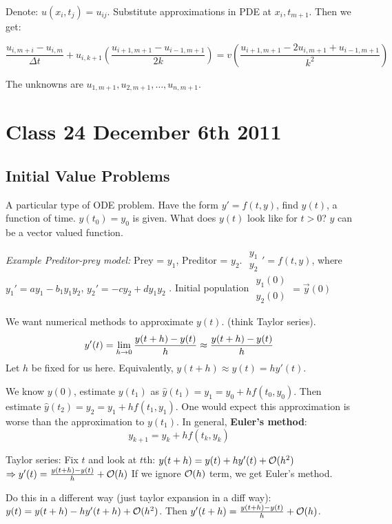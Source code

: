 Denote: $u(x_i, t_j) = u_{ij}$. Substitute approximations in PDE at
$x_i, t_{m+1}$. Then we get:

$$\frac{u_{i,m+i} - u_{i,m}}{\Delta t} +
u_{i,k+1}(\frac{u_{i+1,m+1}-u_{i-1,m+1}}{2k}) = v
  (\frac{u_{i+1,m+1}-2u_{i,m+1} +u_{i-1,m+1}}{k^2})$$

The unknowns are $u_{1,m+1}, u_{2,m+1}, \dots, u_{n,m+1}$.

\section{Class 24 December 6th 2011}

\subsection{Initial Value Problems}
A particular type of ODE problem. Have the form $y' = f(t,y)$, find
$y(t)$, a function of time. $y(t_0)=y_0$ is given. What does $y(t)$
look like for $t>0$? $y$ can be a vector valued function.

\emph{Example Preditor-prey model:} Prey = $y_1$, Preditor =
$y_2$. $
\begin{smallmatrix}
  y_1\\y_2
\end{smallmatrix}' = f(t,y)$, where $y_1' = ay_1 - b_1y_1y_2$, $y_2' =-cy_2 + dy_1y_2$ .
Initial population $\begin{smallmatrix}
  y_1(0)\\y_2(0) \end{smallmatrix}  = \vec y(0)$

We want numerical methods to approximate $y(t)$. (think Taylor
series).
$$y'(t) = \lim_{h\rightarrow 0}\frac{y(t+h)-y(t)}{h}\approx
\frac{y(t+h)-y(t)}{h}$$
Let $h$ be fixed for us here.
Equivalently, $y(t+h) \approx y(t) = hy'(t)$.

We know $y(0)$, estimate $y(t_1)$ as $\hat y(t_1) = y_1 = y_0 +
hf(t_0, y_0)$. Then estimate $\hat y(t_2) = y_2 = y_1 +
hf(t_1,y_1)$. One would expect this approximation is worse than the
approximation to $y(t_1)$.
In general, \textbf{Euler's method}: $$y_{k+1} = y_k + hf(t_k,y_k)$$ 

Taylor series: Fix $t$ and look at $t$th: $y(t+h) = y(t) + hy'(t) +
\mathcal{O}(h^2)$ $\Rightarrow y'(t) = \frac{y(t+h)-y(t)}{h} + \mathcal{O}(h)$
If we ignore $\mathcal{O}(h)$ term, we get Euler's method.

Do this in a different way (just taylor expansion in a diff way):
$y(t) = y(t+h) - hy'(t+h) + \mathcal{O}(h^2)$. Then $y'(t+h) = \frac{y(t+h) -
  y(t)}{h} + \mathcal{O}(h)$.

